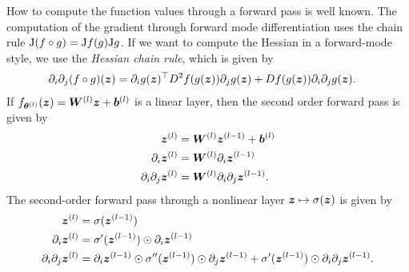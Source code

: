 How to compute the function values through a forward pass is well known. 
The computation of the gradient through forward mode differentiation uses the chain rule $\mathrm{J} (f\circ g) = \mathrm{J} f (g) \mathrm{J} g$. 
If we want to compute the Hessian in a forward-mode style, we use the \emph{Hessian chain rule}, which is given by 
\begin{align} 
       \partial_i \partial_j (f \circ g)({\bm{z}}) & = \partial_i g({\bm{z}})^\top D^2f(g({\bm{z}}))\partial_j g({\bm{z}}) + Df(g({\bm{z}})) \partial_i \partial_j g({\bm{z}}). 
\end{align}
If $f_{{\bm{\theta}}^{(l)}}({\bm{z}}) = {\bm{W}}^{(l)} {\bm{z}} + {\bm{b}}^{(l)}$ is a linear layer, then the second order forward pass is given by 
\begin{subequations}
    \begin{align}
    {\bm{z}}^{(l)} & = {\bm{W}}^{(l)} {\bm{z}}^{(l-1)} + {\bm{b}}^{(l)} \\ 
    \partial_{i} {\bm{z}}^{(l)} & = {\bm{W}}^{(l)} \partial_i {\bm{z}}^{(l-1)} \\ 
    \partial_i\partial_j {\bm{z}}^{(l)} & = {\bm{W}}^{(l)} \partial_i\partial_j {\bm{z}}^{(l-1)} \label{subeq:secondOrderForward-LinearLayer}. 
\end{align}
\end{subequations}
The second-order forward pass through a nonlinear layer ${\bm{z}}\mapsto \sigma({\bm{z}})$ is given by  
\begin{subequations}
    \begin{align}
    {\bm{z}}^{(l)} & = \sigma({\bm{z}}^{(l-1)}) \\ 
    \partial_{i} {\bm{z}}^{(l)} & = \sigma'({\bm{z}}^{(l-1)}) \odot \partial_i {\bm{z}}^{(l-1)} \\ 
    \partial_i\partial_j {\bm{z}}^{(l)} & = \partial_i {\bm{z}}^{(l-1)} \odot \sigma''({\bm{z}}^{(l-1)}) \odot \partial_j {\bm{z}}^{(l-1)} + \sigma'({\bm{z}}^{(l-1)}) \odot \partial_i \partial_j {\bm{z}}^{(l-1)} \label{subeq:secondOrderForward-nonlinearLayer}. 
\end{align}
\end{subequations}


